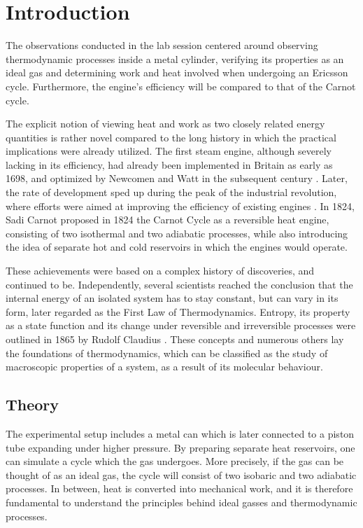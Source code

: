 \newpage
\section{Introduction}
\label{Introduction}

The observations conducted in the lab session centered around observing thermodynamic processes inside a metal cylinder, verifying its properties as an ideal gas and determining work and heat involved when undergoing an Ericsson cycle. Furthermore, the engine's efficiency will be compared to that of the Carnot cycle.  

The explicit notion of viewing heat and work as two closely related energy quantities is rather novel compared to the long history in which the practical implications were already utilized. The first steam engine, although severely lacking in its efficiency, had already been implemented in Britain as early as 1698, and optimized by Newcomen and Watt in the subsequent century \cite{Saslow2020AHO}. Later, the rate of development sped up during the peak of the industrial revolution, where efforts were aimed at improving the efficiency of existing engines \cite{LumenLearning}. In 1824, Sadi Carnot proposed in 1824 the Carnot Cycle as a reversible heat engine, consisting of two isothermal and two adiabatic processes, while also introducing the idea of separate hot and cold reservoirs in which the engines would operate. \cite{Saslow2020AHO}

These achievements were based on a complex history of discoveries, and continued to be. Independently, several scientists reached the conclusion that the internal energy of an isolated system has to stay constant, but can vary in its form, later regarded as the First Law of Thermodynamics. Entropy, its property as a state function and its change under reversible and irreversible processes were outlined in 1865 by Rudolf Claudius \cite{Saslow2020AHO}. These concepts and numerous others lay the foundations of thermodynamics, which can be classified as the study of macroscopic properties of a system, as a result of its molecular behaviour. \cite{LabManual}

\subsection{Theory}
\label{Theory}

The experimental setup includes a metal can which is later connected to a piston tube expanding under higher pressure. By preparing separate heat reservoirs, one can simulate a cycle which the gas undergoes. More precisely, if the gas can be thought of as an ideal gas, the cycle will consist of two isobaric and two adiabatic processes. In between, heat is converted into mechanical work, and it is therefore fundamental to understand the principles behind ideal gasses and thermodynamic processes.

